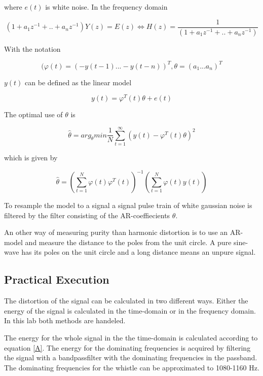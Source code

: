 \documentclass[12pt]{article}
\begin{document}
where $e(t)$ is white noise. In the frequency domain

\begin{equation}
\label{Hfreq}
(1+a_1z^{-1}+..+a_nz^{-1})Y(z)=E(z) \Leftrightarrow H(z) = \frac{1}{(1+a_1z^{-1}+..+a_nz^{-1})}
\end{equation}


With the notation

\begin{equation}
(\varphi(t) =(-y(t-1) ... -y(t-n))^T,\theta = (a_1 ... a_n)^T 
\end{equation}

$y(t)$ can be defined as the linear model

\begin{equation}
y(t)=\varphi^T(t)\theta+ e(t)
\end{equation}

The optimal use of $\theta$ is

\begin{equation}
\hat{\theta}=arg_{\theta}min \frac{1}{N}\sum_{t=1}^{\infty}(y(t)-\varphi^T(t)\theta)^2
\end{equation}

which is given by

\begin{equation}
\hat{\theta}=\left(\sum_{t=1}^N\varphi(t)\varphi^T(t)\right)^{-1}\left(\sum_{t=1}^N\varphi(t)y(t)\right)
\label{enwhis}
\end{equation}

To resample the model to a signal a signal pulse train of white gaussian noise is filtered by the filter consisting of the AR-coeffiecients $\theta$.

An other way of measuring purity than harmonic distortion is to use an AR-model and measure the distance to the poles from the unit circle. A pure sine-wave has its poles on the unit circle and a long distance means an unpure signal.


\subsection{Practical Execution}
The distortion of the signal can be calculated in two different ways. Either the energy of the signal is calculated in the time-domain or in the frequency domain. In this lab both methods are handeled.

The energy for the whole signal in the the time-domain is calculated according to equation \ref{A}. The energy for the dominating frequencies is acquired by filtering the signal with a bandpassfilter with the dominating frequencies in the passband. The dominating frequencies for the whistle can be approximated to 1080-1160 Hz. 
\end{document}
